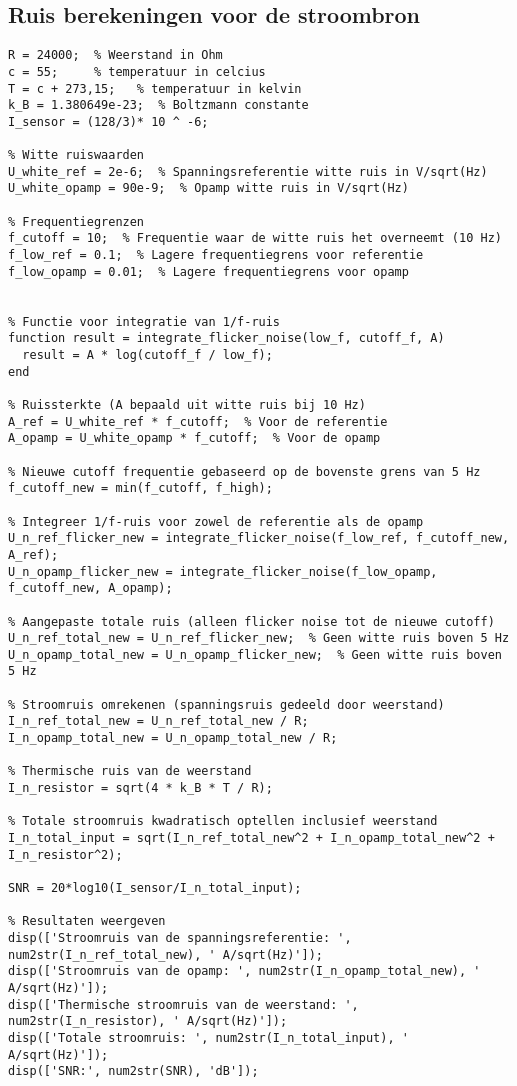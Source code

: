 \subsection{Ruis berekeningen voor de stroombron}
\begin{lstlisting}[caption={Octave code voor de ruis berekeningen van de Stroombron}, label={lst:octave_code_noise_current}]
% Gegeven waarden
R = 24000;  % Weerstand in Ohm
c = 55;     % temperatuur in celcius
T = c + 273,15;   % temperatuur in kelvin
k_B = 1.380649e-23;  % Boltzmann constante
I_sensor = (128/3)* 10 ^ -6;

% Witte ruiswaarden
U_white_ref = 2e-6;  % Spanningsreferentie witte ruis in V/sqrt(Hz)
U_white_opamp = 90e-9;  % Opamp witte ruis in V/sqrt(Hz)

% Frequentiegrenzen
f_cutoff = 10;  % Frequentie waar de witte ruis het overneemt (10 Hz)
f_low_ref = 0.1;  % Lagere frequentiegrens voor referentie
f_low_opamp = 0.01;  % Lagere frequentiegrens voor opamp


% Functie voor integratie van 1/f-ruis
function result = integrate_flicker_noise(low_f, cutoff_f, A)
  result = A * log(cutoff_f / low_f);
end

% Ruissterkte (A bepaald uit witte ruis bij 10 Hz)
A_ref = U_white_ref * f_cutoff;  % Voor de referentie
A_opamp = U_white_opamp * f_cutoff;  % Voor de opamp

% Nieuwe cutoff frequentie gebaseerd op de bovenste grens van 5 Hz
f_cutoff_new = min(f_cutoff, f_high);

% Integreer 1/f-ruis voor zowel de referentie als de opamp
U_n_ref_flicker_new = integrate_flicker_noise(f_low_ref, f_cutoff_new, A_ref);
U_n_opamp_flicker_new = integrate_flicker_noise(f_low_opamp, f_cutoff_new, A_opamp);

% Aangepaste totale ruis (alleen flicker noise tot de nieuwe cutoff)
U_n_ref_total_new = U_n_ref_flicker_new;  % Geen witte ruis boven 5 Hz
U_n_opamp_total_new = U_n_opamp_flicker_new;  % Geen witte ruis boven 5 Hz

% Stroomruis omrekenen (spanningsruis gedeeld door weerstand)
I_n_ref_total_new = U_n_ref_total_new / R;
I_n_opamp_total_new = U_n_opamp_total_new / R;

% Thermische ruis van de weerstand
I_n_resistor = sqrt(4 * k_B * T / R);

% Totale stroomruis kwadratisch optellen inclusief weerstand
I_n_total_input = sqrt(I_n_ref_total_new^2 + I_n_opamp_total_new^2 + I_n_resistor^2);

SNR = 20*log10(I_sensor/I_n_total_input);

% Resultaten weergeven
disp(['Stroomruis van de spanningsreferentie: ', num2str(I_n_ref_total_new), ' A/sqrt(Hz)']);
disp(['Stroomruis van de opamp: ', num2str(I_n_opamp_total_new), ' A/sqrt(Hz)']);
disp(['Thermische stroomruis van de weerstand: ', num2str(I_n_resistor), ' A/sqrt(Hz)']);
disp(['Totale stroomruis: ', num2str(I_n_total_input), ' A/sqrt(Hz)']);
disp(['SNR:', num2str(SNR), 'dB']);
\end{lstlisting}
